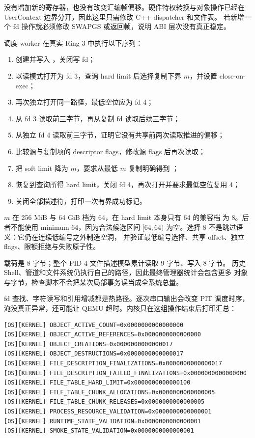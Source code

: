 没有增加新的寄存器，也没有改变汇编帧偏移。硬件特权转换与对象操作已经在
UserContext 边界分开，因此这里只需修改 C++ dispatcher 和文件表。
若新增一个 fd 操作就必须修改 SWAPGS 或返回帧，说明 ABI 层次没有真正稳定。

调度 worker 在真实 Ring 3 中执行以下序列：

\begin{enumerate}
  \item 创建并写入 ，关闭写 fd；
  \item 以读模式打开为 fd 3，查询 hard limit 后选择复制下界 \(m\)，并设置
        close-on-exec；
  \item 再次独立打开同一路径，最低空位应为 fd 4；
  \item 从 fd 3 读取前三字节，再从复制 fd 读取后续三字节；
  \item 从独立 fd 4 读取前三字节，证明它没有共享前两次读取推进的偏移；
  \item 比较源与复制项的 descriptor flags，修改源 flags 后再次读取；
  \item 把 soft limit 降为 \(m\)，要求从最低 \(m\) 复制明确得到 ；
  \item 恢复到查询所得 hard limit，关闭 fd 4，再次打开并要求最低空位复用 4；
  \item 关闭全部描述符，打印一次有界成功标记。
\end{enumerate}

\(m\) 在 256 MiB 与 64 GiB 档为 64，在 hard limit 本身只有 64 的兼容档
为 8。后者不能使用 minimum 64，因为合法候选区间
\([64,64)\) 为空。选择 8 不是跳过语义：它仍在连续低编号之外制造空洞，
并验证最低编号选择、共享 offset、独立 flags、限额拒绝与失败原子性。

载荷是 8 字节；整个 PID 4 文件描述模型累计读取 9 字节、写入 8 字节。
历史 Shell、管道和文件系统仍执行自己的路径，因此最终管理器统计会包含更多
对象与字节，检查脚本不会把某次局部事务误当成全系统总量。

fd 查找、字符读写和引用增减都是热路径。逐次串口输出会改变 PIT 调度时序，
淹没真正异常，还可能让 QEMU 超时。内核只在这组操作结束后打印汇总：

\begin{lstlisting}[caption={functional 运行的一次对象统计}]
[OS][KERNEL] OBJECT_ACTIVE_COUNT=0x0000000000000000
[OS][KERNEL] OBJECT_ACTIVE_REFERENCES=0x0000000000000000
[OS][KERNEL] OBJECT_CREATIONS=0x0000000000000017
[OS][KERNEL] OBJECT_DESTRUCTIONS=0x0000000000000017
[OS][KERNEL] FILE_DESCRIPTION_FINALIZATIONS=0x0000000000000017
[OS][KERNEL] FILE_DESCRIPTION_FAILED_FINALIZATIONS=0x0000000000000000
[OS][KERNEL] FILE_TABLE_HARD_LIMIT=0x0000000000000100
[OS][KERNEL] FILE_TABLE_CHUNK_ALLOCATIONS=0x0000000000000005
[OS][KERNEL] FILE_TABLE_CHUNK_RELEASES=0x0000000000000005
[OS][KERNEL] PROCESS_RESOURCE_VALIDATION=0x0000000000000001
[OS][KERNEL] RUNTIME_STATE_VALIDATION=0x0000000000000001
[OS][KERNEL] SMOKE_STATE_VALIDATION=0x0000000000000001
\end{lstlisting}

